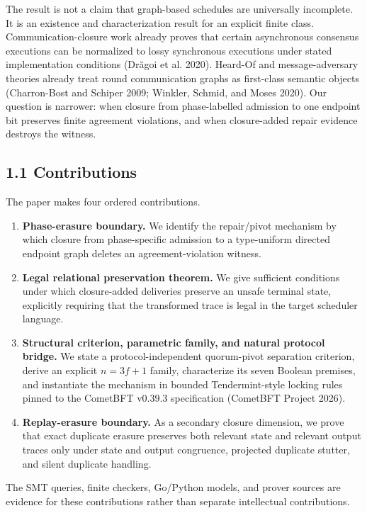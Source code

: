 \documentclass[10pt,a4paper]{article}
\newcommand{\tightlist}{\setlength{\itemsep}{0pt}\setlength{\parskip}{0pt}}
\begin{document}
The result is not a claim that graph-based schedules are universally
incomplete. It is an existence and characterization result for an
explicit finite class. Communication-closure work already proves that
certain asynchronous consensus executions can be normalized to lossy
synchronous executions under stated implementation conditions (Drăgoi et
al. 2020). Heard-Of and message-adversary theories already treat round
communication graphs as first-class semantic objects (Charron-Bost and
Schiper 2009; Winkler, Schmid, and Moses 2020). Our question is
narrower: when closure from phase-labelled admission to one endpoint bit
preserves finite agreement violations, and when closure-added repair
evidence destroys the witness.

\subsection{1.1 Contributions}\label{contributions}

The paper makes four ordered contributions.

\begin{enumerate}
\def\labelenumi{\arabic{enumi}.}
\tightlist
\item
  \textbf{Phase-erasure boundary.} We identify the repair/pivot
  mechanism by which closure from phase-specific admission to a
  type-uniform directed endpoint graph deletes an agreement-violation
  witness.
\item
  \textbf{Legal relational preservation theorem.} We give sufficient
  conditions under which closure-added deliveries preserve an unsafe
  terminal state, explicitly requiring that the transformed trace is
  legal in the target scheduler language.
\item
  \textbf{Structural criterion, parametric family, and natural protocol
  bridge.} We state a protocol-independent quorum-pivot separation
  criterion, derive an explicit \(n=3f+1\) family, characterize its
  seven Boolean premises, and instantiate the mechanism in bounded
  Tendermint-style locking rules pinned to the CometBFT v0.39.3
  specification (CometBFT Project 2026).
\item
  \textbf{Replay-erasure boundary.} As a secondary closure dimension, we
  prove that exact duplicate erasure preserves both relevant state and
  relevant output traces only under state and output congruence,
  projected duplicate stutter, and silent duplicate handling.
\end{enumerate}

The SMT queries, finite checkers, Go/Python models, and prover sources
are evidence for these contributions rather than separate intellectual
contributions.
\end{document}
